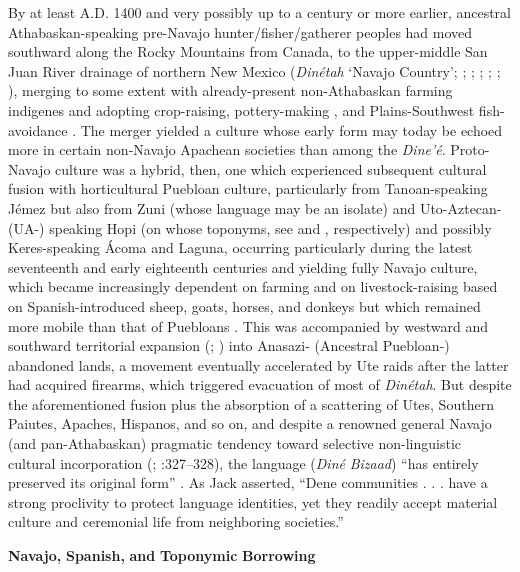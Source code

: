   By at least A.D. 1400 and very possibly up to a century or more earlier, ancestral Athabaskan-speaking pre-Navajo hunter/fisher/gatherer peoples had moved southward along the Rocky Mountains from Canada, to the upper-middle San Juan River drainage of northern New Mexico (\textit{Dinétah} ‘Navajo Country’; \citealt{Jett1964}; \citealt{Seymour2012}; \citealt{MatsonMagne2013}; \citealt{Haskell1987}; \citealt{Perry1991}; \citealt{IvesEtAl2014}), merging to some extent with already-present non-Athabaskan farming indigenes \citep{Brugge2006} and adopting crop-raising, pottery-making \citep{Brugge1973}, and Plains-Southwest fish-avoidance \citep[254]{Simoons1994}.  The merger yielded a culture whose early form may today be echoed more in certain non-Navajo Apachean societies than among the \textit{Dine’é}.  Proto-Navajo culture was a hybrid, then, one which experienced subsequent cultural fusion with horticultural Puebloan culture, particularly from Tanoan-speaking Jémez but also from Zuni (whose language may be an isolate) and Uto-Aztecan- (UA-) speaking Hopi (on whose toponyms, see \citealt{FergusonEtAl1985} and \citealt{HedquistEtAl2014}, respectively) and possibly Keres-speaking Ácoma and Laguna, occurring particularly during the latest seventeenth and early eighteenth centuries and yielding fully Navajo culture, which became increasingly dependent on farming and on livestock-raising based on Spanish-introduced sheep, goats, horses, and donkeys but which remained more mobile than that of Puebloans \citep{Jett1978}.  This was accompanied by westward and southward territorial expansion (\citealt{Hester1962}; \citealt{Towner1996}) into Anasazi- (Ancestral Puebloan-) abandoned lands, a movement eventually accelerated by Ute raids after the latter had acquired firearms, which triggered evacuation of most of \textit{Dinétah}.  But despite the aforementioned fusion plus the absorption of a scattering of Utes, Southern Paiutes, Apaches, Hispanos, and so on, and despite a renowned general Navajo (and pan-Athabaskan) pragmatic tendency toward selective non-linguistic cultural incorporation (\citealt{Farmer1953}; \citealt{Vogt1961}:327–328), the language (\textit{Diné} \textit{Bizaad}) “has entirely preserved its original form” \citep[313]{Mirkowich1941}.  As Jack \citet[619]{IvesEtAl2014} asserted, “Dene communities . . . have a strong proclivity to protect language identities, yet they readily accept material culture and ceremonial life from neighboring societies.”

\textbf{Navajo,} \textbf{Spanish,} \textbf{and} \textbf{Toponymic} \textbf{Borrowing}

